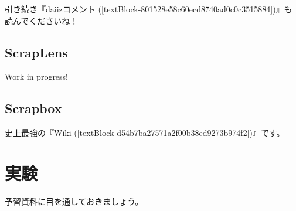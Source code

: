 引き続き『daiizコメント {\scriptsize (\autoref{textBlock-801528e58c60ecd8740ad0c0c3515884})}』も読んでくださいね！\\

\subsection{ScrapLens} %
\label{textBlock-4f160c041eb4f5555ab8406fe41f5941}
Work in progress!

\subsection{Scrapbox}
史上最強の『Wiki {\scriptsize (\autoref{textBlock-d54b7ba27571a2f00b38ed9273b974f2})}』です。\\

\section{実験}
予習資料に目を通しておきましょう。\\


